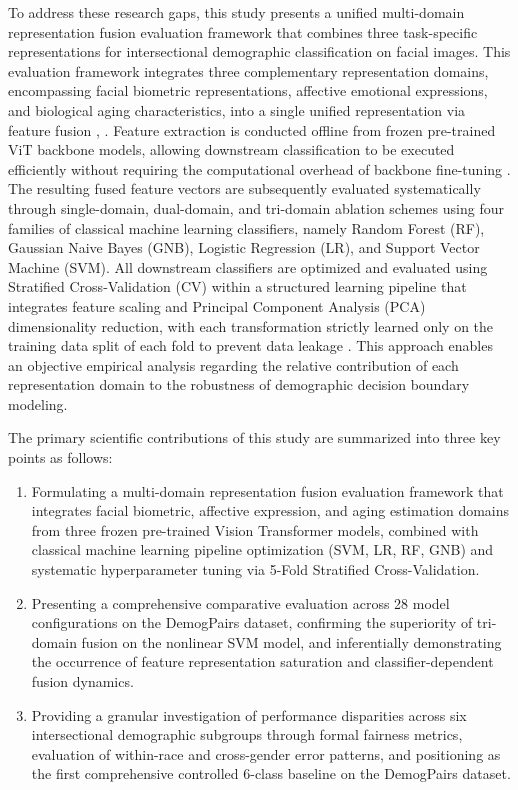To address these research gaps, this study presents a unified multi-domain representation fusion evaluation framework that combines three task-specific representations for intersectional demographic classification on facial images. This evaluation framework integrates three complementary representation domains, encompassing facial biometric representations, affective emotional expressions, and biological aging characteristics, into a single unified representation via feature fusion \cite{ref21}, \cite{ref22}. Feature extraction is conducted offline from frozen pre-trained ViT backbone models, allowing downstream classification to be executed efficiently without requiring the computational overhead of backbone fine-tuning \cite{ref23}. The resulting fused feature vectors are subsequently evaluated systematically through single-domain, dual-domain, and tri-domain ablation schemes using four families of classical machine learning classifiers, namely Random Forest (RF), Gaussian Naive Bayes (GNB), Logistic Regression (LR), and Support Vector Machine (SVM). All downstream classifiers are optimized and evaluated using Stratified Cross-Validation (CV) within a structured learning pipeline that integrates feature scaling and Principal Component Analysis (PCA) dimensionality reduction, with each transformation strictly learned only on the training data split of each fold to prevent data leakage \cite{ref24}. This approach enables an objective empirical analysis regarding the relative contribution of each representation domain to the robustness of demographic decision boundary modeling.

The primary scientific contributions of this study are summarized into three key points as follows:
\begin{enumerate}
\item Formulating a multi-domain representation fusion evaluation framework that integrates facial biometric, affective expression, and aging estimation domains from three frozen pre-trained Vision Transformer models, combined with classical machine learning pipeline optimization (SVM, LR, RF, GNB) and systematic hyperparameter tuning via 5-Fold Stratified Cross-Validation.
\item Presenting a comprehensive comparative evaluation across 28 model configurations on the DemogPairs dataset, confirming the superiority of tri-domain fusion on the nonlinear SVM model, and inferentially demonstrating the occurrence of feature representation saturation and classifier-dependent fusion dynamics.
\item Providing a granular investigation of performance disparities across six intersectional demographic subgroups through formal fairness metrics, evaluation of within-race and cross-gender error patterns, and positioning as the first comprehensive controlled 6-class baseline on the DemogPairs dataset.
\end{enumerate}

